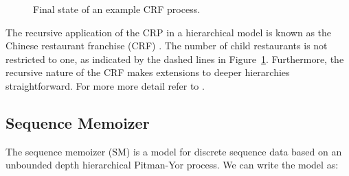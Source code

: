 \begin{figure}[t] 
	\begin{center}
		\caption{Final state of an example CRF process.}
		\label{figHPY}
	\end{center} 
\end{figure} 


The recursive application of the CRP in a hierarchical model is known as the Chinese restaurant franchise (CRF) \cite{Teh2006b}.  The number of child restaurants is not restricted to one, as indicated by the dashed lines in Figure~\ref{figHPY}.  Furthermore, the recursive nature of the CRF makes extensions to deeper hierarchies straightforward. For more more detail refer to \cite{Teh2006b, Teh2006a}.

\subsection{Sequence Memoizer}

The sequence memoizer (SM) \cite{Wood2009} is a model for discrete sequence data based on an unbounded depth hierarchical Pitman-Yor process. We can write the model as:

